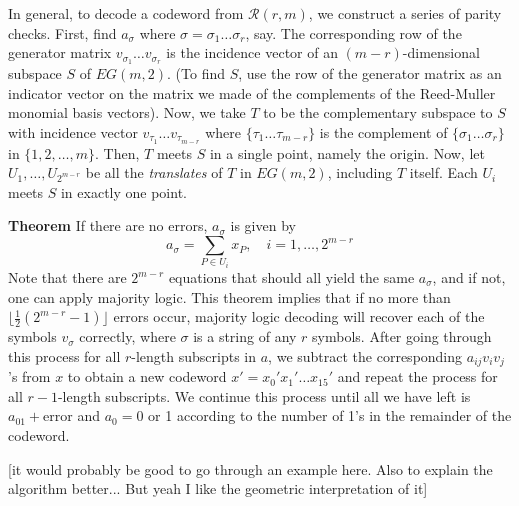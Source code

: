 \documentclass[12pt]{article}
\begin{document}
In general, to decode a codeword from $\mathscr{R}(r,m)$, we construct a series of parity checks. First, find $a_{\sigma}$ where $\sigma = \sigma_1 \ldots \sigma_r$, say. The corresponding row of the generator matrix $v_{\sigma_1} \ldots v_{\sigma_r}$ is the incidence vector of an $(m-r)$-dimensional subspace $S$ of $EG(m,2)$. (To find $S$, use the row of the generator matrix as an indicator vector on the matrix we made of the complements of the Reed-Muller monomial basis vectors). Now, we take $T$ to be the complementary subspace to $S$ with incidence vector $v_{\tau_1} \ldots v_{\tau_{m-r}}$ where $\{\tau_1 \ldots \tau_{m-r}\}$ is the complement of $\{\sigma_1 \ldots \sigma_r\}$ in $\{1, 2, \ldots, m\}$. Then, $T$ meets $S$ in a single point, namely the origin. Now, let $U_1, \ldots, U_{2^{m-r}}$ be all the \textit{translates} of $T$ in $EG(m,2)$, including $T$ itself. Each $U_i$ meets $S$ in exactly one point.

\textbf{Theorem} If there are no errors, $a_{\sigma}$ is given by 
\begin{equation*}
a_{\sigma} = \sum_{P \in U_i} x_P, \quad i = 1, \ldots , 2^{m-r}
\end{equation*}
Note that there are $2^{m-r}$ equations that should all yield the same $a_{\sigma}$, and if not, one can apply majority logic. This theorem implies that if no more than $\lfloor\frac{1}{2}(2^{m-r} -1)\rfloor$ errors occur, majority logic decoding will recover each of the symbols $v_{\sigma}$ correctly, where $\sigma$ is a string of any $r$ symbols. 
	After going through this process for all $r$-length subscripts in $a$, we subtract the corresponding $a_{ij}v_iv_j$'s from $x$ to obtain a new codeword $x' = x_0'x_1' \ldots x_{15}'$ and repeat the process for all $r-1$-length subscripts. We continue this process until all we have left is $a_01 + \text{error}$ and $a_0 = 0$ or 1 according to the number of 1's in the remainder of the codeword.

[it would probably be good to go through an example here. Also to explain the algorithm better... But yeah I like the geometric interpretation of it]
\end{document}
